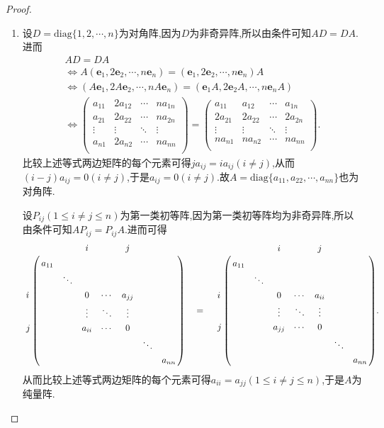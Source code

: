 \documentclass[../../main.tex]{subfiles}%
\begin{document}
\begin{proof}
\begin{enumerate}
\item 设\(D=\text{diag}\{1,2,\cdots,n\}\)为对角阵,因为$D$为非奇异阵,所以由条件可知\(AD = DA\).进而
\begin{gather*}
AD=DA
\\
\Leftrightarrow A\left( \boldsymbol{e}_1,2\boldsymbol{e}_2,\cdots ,n\boldsymbol{e}_n \right) =\left( \boldsymbol{e}_1,2\boldsymbol{e}_2,\cdots ,n\boldsymbol{e}_n \right) A
\\
\Leftrightarrow \left( A\boldsymbol{e}_1,2A\boldsymbol{e}_2,\cdots ,nA\boldsymbol{e}_n \right) =\left( \boldsymbol{e}_1A,2\boldsymbol{e}_2A,\cdots ,n\boldsymbol{e}_nA \right) 
\\
\Leftrightarrow \left( \begin{matrix}
a_{11}&		2a_{12}&		\cdots&		na_{1n}\\
a_{21}&		2a_{22}&		\cdots&		na_{2n}\\
\vdots&		\vdots&		\ddots&		\vdots\\
a_{n1}&		2a_{n2}&		\cdots&		na_{nn}\\
\end{matrix} \right) =\left( \begin{matrix}
a_{11}&		a_{12}&		\cdots&		a_{1n}\\
2a_{21}&		2a_{22}&		\cdots&		2a_{2n}\\
\vdots&		\vdots&		\ddots&		\vdots\\
na_{n1}&		na_{n2}&		\cdots&		na_{nn}\\
\end{matrix} \right).
\end{gather*}
比较上述等式两边矩阵的每个元素可得$ja_{ij}=ia_{ij}\left( i\ne j \right)$,从而$\left( i-j \right) a_{ij}=0\left( i\ne j \right)$,于是$a_{ij}=0\left( i\ne j \right) $.故\(A=\text{diag}\{a_{11},a_{22},\cdots,a_{nn}\}\)也为对角阵.

设\(P_{ij}(1\leqslant  i\neq j\leqslant  n)\)为第一类初等阵,因为第一类初等阵均为非奇异阵,所以由条件可知\(AP_{ij}=P_{ij}A\).进而可得
\begin{align*}
\bordermatrix{%
&    &		&		i&		&		j&		&		\cr
&    a_{11}&		&		&		&		&		&		\cr
&    &		\ddots&		&		&		&		&		\cr
i&    &		&		0&		\cdots&		a_{jj}&		&		\cr
&   &		&		\vdots&		\ddots&		\vdots&		&		\cr
j&    &		&		a_{ii}&		\cdots&		0&		&		\cr
&    &		&		&		&		&		\ddots&		\cr
&    &		&		&		&		&		&		a_{nn}\cr
} \quad =\quad \bordermatrix{%
&    &		&		i&		&		j&		&		\cr
&    a_{11}&		&		&		&		&		&		\cr
&    &		\ddots&		&		&		&		&		\cr
i&    &		&		0&		\cdots&		a_{ii}&		&		\cr
&    &		&		\vdots&		\ddots&		\vdots&		&		\cr
j&   &		&		a_{jj}&		\cdots&		0&		&		\cr
&    &		&		&		&		&		\ddots&		\cr
&    &		&		&		&		&		&		a_{nn}\cr
} .
\end{align*}
从而比较上述等式两边矩阵的每个元素可得\(a_{ii}=a_{jj}(1\leqslant  i\neq j\leqslant  n)\),于是\(A\)为纯量阵.


\end{enumerate}
\end{proof}
\end{document}
